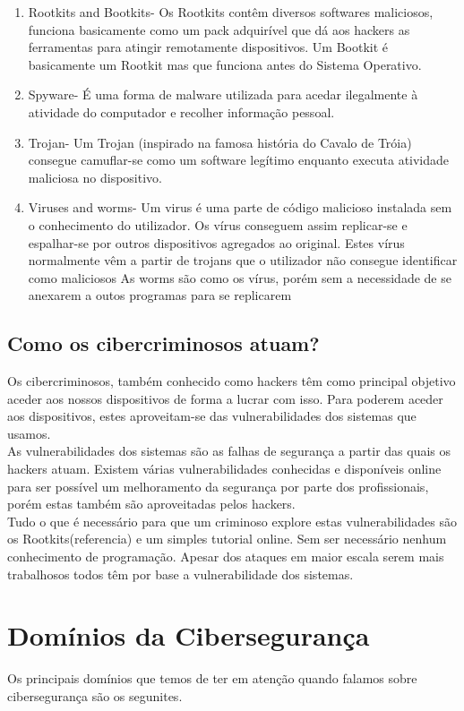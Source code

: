 \documentclass{report}
\begin{document}
\begin{description}
\begin{enumerate}
    	\item Rootkits and Bootkits- Os Rootkits contêm diversos softwares maliciosos, funciona basicamente como um pack adquirível que dá aos hackers as ferramentas para atingir remotamente dispositivos.
Um Bootkit é basicamente um Rootkit mas que funciona antes do Sistema Operativo.
		\item Spyware- É uma forma de malware utilizada para acedar ilegalmente à atividade do computador e recolher informação pessoal.
    	\item Trojan- Um Trojan (inspirado na famosa história do Cavalo de Tróia) consegue camuflar-se como um software legítimo enquanto executa atividade maliciosa no dispositivo.
    	\item Viruses and worms- Um virus é uma parte de código malicioso instalada sem o conhecimento do utilizador. Os vírus conseguem assim replicar-se e espalhar-se por outros dispositivos agregados ao original. Estes vírus normalmente vêm a partir de trojans que o utilizador não consegue identificar como maliciosos
As worms são como os vírus, porém sem a necessidade de se anexarem a outos programas para se replicarem
    \end{enumerate}
      
\end{description}
\section{Como os cibercriminosos atuam?}
	Os cibercriminosos, também conhecido como hackers têm como principal objetivo aceder aos nossos dispositivos de forma a lucrar com isso. Para poderem aceder aos dispositivos, estes aproveitam-se das vulnerabilidades dos sistemas que usamos.\\
	As vulnerabilidades dos sistemas são as falhas de segurança a partir das quais os hackers atuam.
Existem várias vulnerabilidades conhecidas e disponíveis online para ser possível um melhoramento da segurança por parte dos profissionais, porém estas também são aproveitadas pelos hackers.\\
Tudo o que é necessário para que um criminoso explore estas vulnerabilidades são os Rootkits(referencia) e um simples tutorial online. Sem ser necessário nenhum conhecimento de programação.
Apesar dos ataques em maior escala serem mais trabalhosos todos têm por base a vulnerabilidade dos sistemas.

\chapter{Domínios da Cibersegurança}
\label{chap.dominios}
\cite{IBM}
Os principais domínios que temos de ter em atenção quando falamos sobre cibersegurança são os segunites.
\end{document}
